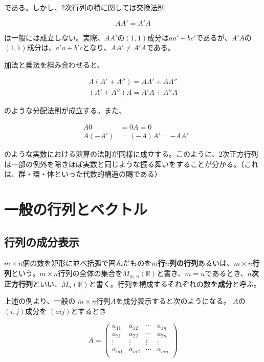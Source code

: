 \documentclass[dvipdfmx,autodetect-engine]{jsarticle}
\begin{document}
である。しかし、2次行列の積に関しては交換法則

$$
AA' = A'A
$$

は一般には成立しない。実際、$AA'$の$(1, 1)$成分は$aa' + bc'$であるが、$A'A$の$(1, 1)$成分は、$a'a + b'c$となり、$AA' \neq A'A$である。

加法と乗法を組み合わせると、

\begin{eqnarray*}
A(A' + A'') = AA' + AA'' \\
(A' + A'')A = A'A + A''A
\end{eqnarray*}

のような分配法則が成立する。また、

\begin{eqnarray*}
&A0 &= 0A = 0 \\
&A(-A') &= (-A)A' = -AA'
\end{eqnarray*}

のような実数における演算の法則が同様に成立する。このように、2次正方行列は一部の例外を除きほぼ実数と同じような振る舞いをすることが分かる。（これは、群・環・体といった代数的構造の賜である）

\section{一般の行列とベクトル}

\subsection{行列の成分表示}

$m \times n$個の数を矩形に並べ括弧で囲んだものを{\bf $m$行$n$列の行列}あるいは、{\bf $m \times n$行列}という。$m \times n$行列の全体の集合を$M_{m,n}(\mathbb{R})$と書き、$m = n$であるとき、{\bf $n$次正方行列}といい、$M_n(\mathbb{R})$と書く。行列を構成するそれぞれの数を{\bf 成分}と呼ぶ。


上述の例より、一般の $m \times n$行列$A$を成分表示すると次のようになる。 $A$の $(i, j)$成分を $(aij)$とするとき

$$
A = \begin{pmatrix}
a_{11} & a_{12} & \cdots & a_{1n} \\
a_{21} & a_{22} & \cdots & a_{2n} \\
\vdots & \vdots & \vdots & \vdots \\
a_{m1} & a_{m2} & \cdots & a_{mn} \\
\end{pmatrix}
$$
\end{document}
